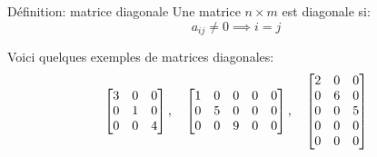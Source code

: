 \documentclass[a4paper]{article}
\begin{document}
\begin{parag}{Définition: matrice diagonale}
    Une matrice $n \times m$ est diagonale si:
    \[a_{ij} \neq 0 \implies i = j\]

    Voici quelques exemples de matrices diagonales:
    \[\begin{bmatrix} 3 & 0 & 0 \\ 0 & 1 & 0 \\ 0 & 0 & 4 \end{bmatrix}, \quad \begin{bmatrix} 1 & 0 & 0 & 0 & 0 \\ 0 & 5 & 0 & 0 & 0 \\ 0 & 0 & 9 & 0 & 0 \end{bmatrix}, \quad \begin{bmatrix} 2 & 0 & 0 \\ 0 & 6 & 0 \\ 0 & 0 & 5 \\ 0 & 0 & 0 \\ 0 & 0 & 0 \end{bmatrix}  \]
\end{parag}
\end{document}
